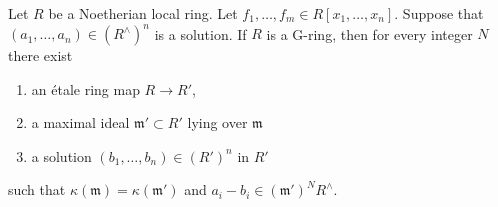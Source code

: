 \begin{theorem}
\label{theorem-approximation-property-variant}
Let $R$ be a Noetherian local ring. Let
$f_1, \ldots, f_m \in R[x_1, \ldots, x_n]$.
Suppose that $(a_1, \ldots, a_n) \in (R^\wedge)^n$ is a solution.
If $R$ is a G-ring, then for every integer $N$ there exist
\begin{enumerate}
\item an \'etale ring map $R \to R'$,
\item a maximal ideal $\mathfrak m' \subset R'$ lying over $\mathfrak m$
\item a solution $(b_1, \ldots, b_n) \in (R')^n$ in $R'$
\end{enumerate}
such that $\kappa(\mathfrak m) = \kappa(\mathfrak m')$ and
$a_i - b_i \in (\mathfrak m')^NR^\wedge$.
\end{theorem}

